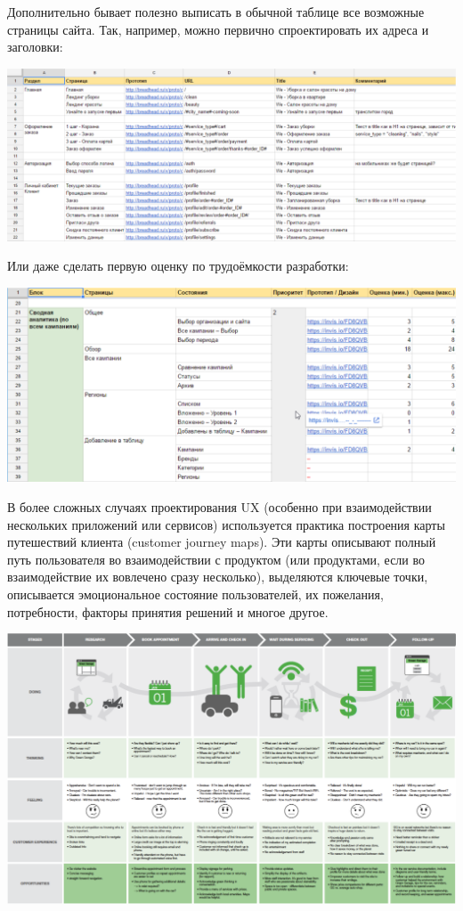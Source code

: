 \documentclass{../../text-style}
\begin{document}
Дополнительно бывает полезно выписать в обычной таблице все возможные страницы сайта. Так, например, можно первично спроектировать их адреса и заголовки:

\begin{center}
    \includegraphics[width=\textwidth]{tableView1.png}
\end{center}

Или даже сделать первую оценку по трудоёмкости разработки:

\begin{center}
    \includegraphics[width=\textwidth]{tableView2.png}
\end{center}

В более сложных случаях проектирования UX (особенно при взаимодействии нескольких приложений или сервисов) используется практика построения карты путешествий клиента (customer journey maps). Эти карты описывают полный путь пользователя во взаимодействии с продуктом (или продуктами, если во взаимодействие их вовлечено сразу несколько), выделяются ключевые точки, описывается эмоциональное состояние пользователей, их пожелания, потребности, факторы принятия решений и многое другое. 

\begin{center}
    \includegraphics[width=\textwidth]{customerJourneyMaps.png}
\end{center}
\end{document}
